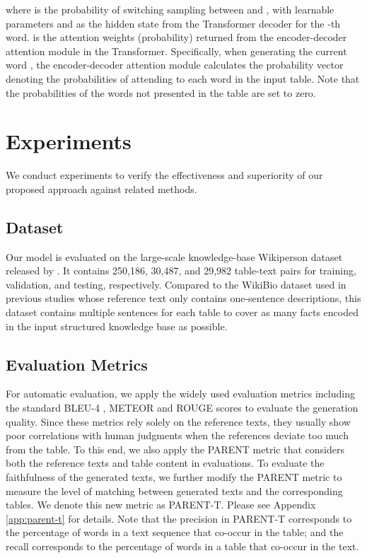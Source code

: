 \documentclass[11pt,a4paper]{article}
\begin{document}
where  is the probability of switching sampling between  and , with learnable parameters  and  as the hidden state from the Transformer decoder for the -th word.  is the attention weights (probability) returned from the encoder-decoder attention module in the Transformer. Specifically, when generating the current word , the encoder-decoder attention module calculates the probability vector  denoting the probabilities of attending to each word in the input table. Note that the probabilities of the words not presented in the table are set to zero.


\section{Experiments}
We conduct experiments to verify the effectiveness and superiority of our proposed approach against related methods.

\subsection{Dataset}

Our model is evaluated on the large-scale knowledge-base Wikiperson dataset released by \citet{Wang2018}. It contains 250,186, 30,487, and 29,982 table-text pairs for training, validation, and testing, respectively. 
Compared to the WikiBio dataset used in previous studies \cite{Wikiemnlp2016,structure2018,Wiseman2018,Ma2019} whose reference text only contains one-sentence descriptions, this
dataset contains multiple sentences for each table to cover as many facts encoded in the input structured knowledge base as possible.


\subsection{Evaluation Metrics}

For automatic evaluation, we apply the widely used evaluation metrics including the standard BLEU-4 \cite{Papineni2002}, METEOR \cite{Denkowski2014} and ROUGE \cite{Lin2004} scores to evaluate the generation quality. 
Since these metrics rely solely on the reference texts, they usually show poor correlations with human judgments when the references deviate too much from the table. 
To this end, we also apply the PARENT \cite{Dhingra2019} metric that considers both the reference texts and table content in evaluations. 
To evaluate the faithfulness of the generated texts, we further modify the PARENT metric to measure the level of matching between generated texts and the corresponding tables. We denote this new metric as PARENT-T. Please see Appendix \ref{app:parent-t} for details. Note that the precision in PARENT-T corresponds to the percentage of words in a text sequence that co-occur in the table; and the recall corresponds to the percentage of words in a table that co-occur in the text. 
\end{document}
